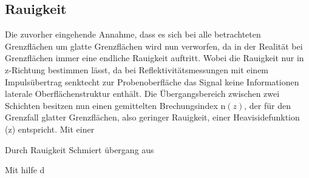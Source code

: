 \subsection{Rauigkeit}
\label{subsec:rauigkeit}
Die zuvorher eingehende
Annahme, dass es sich bei alle betrachteten Grenzflächen um 
glatte Grenzflächen wird nun verworfen, da in 
der Realität bei Grenzflächen immer 
eine endliche Rauigkeit auftritt.
Wobei die Rauigkeit nur in z-Richtung bestimmen lässt, da 
bei Reflektivitätsmessungen mit einem 
Impulsübertrag senktecht zur Probenoberfläche das Signal 
keine Informationen laterale Oberflächenstruktur 
enthält.
Die Übergangsbereich zwischen zwei Schichten besitzen 
nun einen gemittelten Brechungsindex 
$\mathrm{n}(z)$, der für den Grenzfall 
glatter Grenzflächen, also geringer Rauigkeit, 
einer Heavisidefunktion \Theta(z) entspricht.
Mit einer 

Durch Rauigkeit Schmiert übergang aus 

Mit hilfe d



\cite{sample}
